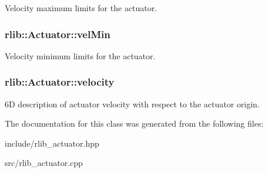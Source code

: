 Velocity maximum limits for the actuator. \hypertarget{classrlib_1_1Actuator_ad8d95d72f27494890e16ed4ab6045f20}{
\subsubsection[{vel\-Min}]{ rlib\-::\-Actuator\-::vel\-Min\hspace{0.3cm}{\ttfamily [protected]}}}\label{classrlib_1_1Actuator_ad8d95d72f27494890e16ed4ab6045f20}
Velocity minimum limits for the actuator. \hypertarget{classrlib_1_1Actuator_a27372af2dd629e7b434eb541de0a13a8}{
\subsubsection[{velocity}]{ rlib\-::\-Actuator\-::velocity\hspace{0.3cm}{\ttfamily [protected]}}}\label{classrlib_1_1Actuator_a27372af2dd629e7b434eb541de0a13a8}
6\-D description of actuator velocity with respect to the actuator origin. 

The documentation for this class was generated from the following files\-:\begin{DoxyCompactItemize}
\item 
include/rlib\-\_\-actuator.\-hpp\item 
src/rlib\-\_\-actuator.\-cpp\end{DoxyCompactItemize}
